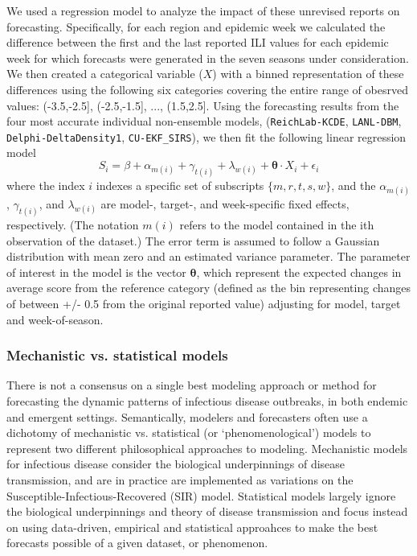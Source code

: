 \documentclass{article}\usepackage[]{graphicx}\usepackage[]{color}
\begin{document}
We used a regression model to analyze the impact of these unrevised reports on forecasting.
Specifically, for each region and epidemic week we calculated the difference between the first and the last reported ILI values for each epidemic week for which forecasts were generated in the seven seasons under consideration.
We then created a categorical variable ($X$) with a binned representation of these differences using the following six categories covering the entire range of obesrved values: (-3.5,-2.5], (-2.5,-1.5], ..., (1.5,2.5].
Using the forecasting results from the four most accurate individual non-ensemble models, ({\tt ReichLab-KCDE}, {\tt LANL-DBM}, {\tt Delphi-DeltaDensity1}, {\tt CU-EKF\_SIRS}), we then fit the following linear regression model
\begin{equation}
S_i = \beta + \alpha_{m(i)} + \gamma_{t(i)} + \lambda_{w(i)} + {\mathbf \theta}\cdot X_i + \epsilon_i
\end{equation}
where the index $i$ indexes a specific set of subscripts $\{m,r,t,s,w\}$, and the $\alpha_{m(i)}$, $\gamma_{t(i)}$, and $\lambda_{w(i)}$ are model-, target-, and week-specific fixed effects, respectively. (The notation $m(i)$ refers to the model contained in the ith observation of the dataset.) The error term is assumed to follow a Gaussian distribution with mean zero and an estimated variance parameter. The parameter of interest in the model is the vector ${\mathbf \theta}$, which represent the expected changes in average score from the reference category (defined as the bin representing changes of between +/- 0.5 from the original reported value) adjusting for model, target and week-of-season.

\subsubsection*{Mechanistic vs. statistical models}

There is not a consensus on a single best modeling approach or method for forecasting the dynamic patterns of infectious disease outbreaks, in both endemic and emergent settings. 
Semantically, modelers and forecasters often use a dichotomy of mechanistic vs. statistical (or `phenomenological') models to represent two different philosophical approaches to modeling.
Mechanistic models for infectious disease consider the biological underpinnings of disease transmission, and are in practice are implemented as variations on the Susceptible-Infectious-Recovered (SIR) model. 
Statistical models largely ignore the biological underpinnings and theory of disease transmission and focus instead on using data-driven, empirical and statistical approahces to make the best forecasts possible of a given dataset, or phenomenon. 
\end{document}
